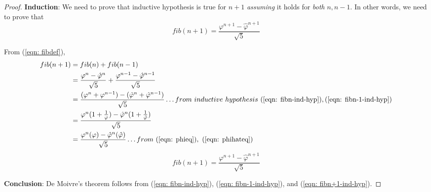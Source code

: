 \documentclass[a4paper]{article}
\renewcommand{\phi}{\varphi}
\begin{document}
\begin{proof}
    \textbf{Induction}: We need to prove that inductive hypothesis is true for $n+1$ \emph{assuming} it holds for \emph{both} $n, n-1$. In other words, we need to prove that
    $$
        fib(n+1)=\frac{\phi^{n+1} - \hat{\phi}^{n+1}}{\sqrt{5}}
    $$

    From (\ref{eqn: fibdef}),
    \begin{align*}
            fib(n+1) 
            &= fib(n) + fib(n-1)\\
            &= \frac{\phi^n - \hat{\phi}^{n}}{\sqrt{5}} + \frac{\phi^{n-1} - \hat{\phi}^{n-1}}{\sqrt{5}}\\
            &= \frac{(\phi^n + \phi^{n-1})-(\hat{\phi}^n + \hat{\phi}^{n-1})}{\sqrt{5}} \dots from~inductive~hypothesis~(\ref{eqn: fibn-ind-hyp}), (\ref{eqn: fibn-1-ind-hyp})\\
            &= \frac{\phi^{n}(1 + \frac{1}{\phi}) - \hat{\phi}^{n}(1 + \frac{1}{\hat\phi})}{\sqrt{5}}\\
            &= \frac{\phi^{n}(\phi) - \hat{\phi}^{n}(\hat\phi)}{\sqrt{5}} \dots from~(\ref{eqn: phieq}),~(\ref{eqn: phihateq})\\
    \end{align*}
    \begin{equation}
        \label{eqn: fibn+1-ind-hyp}
            fib(n+1) = \frac{\phi^{n+1} - \hat\phi^{n+1}}{\sqrt{5}} 
    \end{equation}

    \textbf{Conclusion}: De Moivre's theorem follows from (\ref{eqn: fibn-ind-hyp}), (\ref{eqn: fibn-1-ind-hyp}), and (\ref{eqn: fibn+1-ind-hyp}).

\end{proof}
\end{document}
